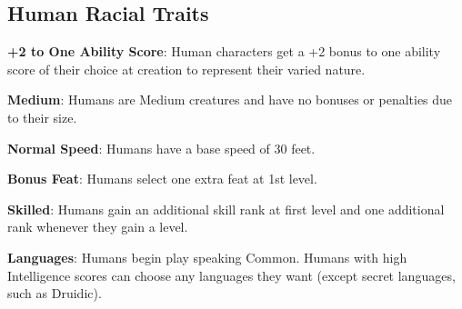 \subsection{Human Racial Traits}

				
\textbf{+2 to One Ability Score}: Human characters get a +2 bonus to one ability score of their choice at creation to represent their varied nature.
				
\textbf{Medium}: Humans are Medium creatures and have no bonuses or penalties due to their size.
				
\textbf{Normal Speed}: Humans have a base speed of 30 feet.
				
\textbf{Bonus Feat}: Humans select one extra feat at 1st level.
				
\textbf{Skilled}: Humans gain an additional skill rank at first level and one additional rank whenever they gain a level.
				
\textbf{Languages}: Humans begin play speaking Common. Humans with high Intelligence scores can choose any languages they want (except secret languages, such as Druidic).
        	